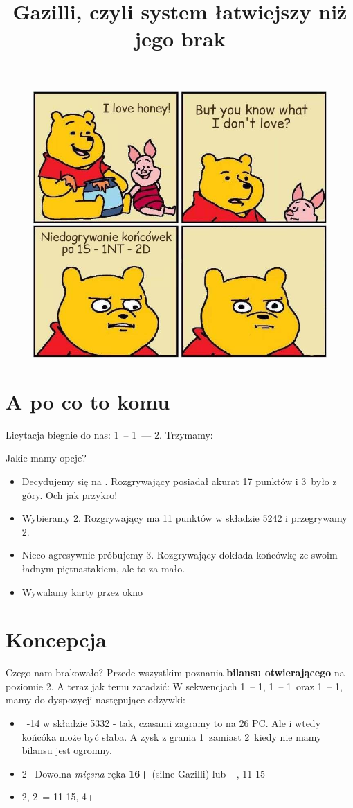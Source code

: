 \documentclass[12pt, a4paper]{article}
\title{Gazilli, czyli system łatwiejszy niż jego brak}
\date{\vspace*{-2cm}}
\begin{document}
\maketitle

\begin{figure}[h!]
    \centering
    \includegraphics[width=0.5\linewidth]{gazilli-1.jpg}
\end{figure}
\section*{A po co to komu}
Licytacja biegnie do nas: 1\spades\ -- 1\nt\ --- 2\diams. Trzymamy:
\begin{center}
\end{center}
Jakie mamy opcje?
\begin{itemize}
    \item Decydujemy się na \pass. Rozgrywający posiadał akurat 17 punktów i 3\nt\ było z góry. Och jak przykro!
    \item Wybieramy 2\hearts. Rozgrywający ma 11 punktów w składzie 5242 i przegrywamy 2\nt.
    \item Nieco agresywnie próbujemy 3\diams. Rozgrywający dokłada końcówkę ze swoim ładnym piętnastakiem,
    ale to za mało.
    \item Wywalamy karty przez okno
\end{itemize}

\pagebreak
\section*{Koncepcja}
Czego nam brakowało? Przede wszystkim poznania \textbf{bilansu otwierającego} na poziomie 2. A teraz jak temu zaradzić:
W sekwencjach 1\hearts\ -- 1\spades, 1\hearts\ -- 1\nt\ oraz 1\spades\ -- 1\nt, mamy do dyspozycji następujące odzywki: 
\begin{itemize}
    \item \pass\ 
    -14 w składzie 5332 - tak, czasami zagramy to na 26 PC. Ale i wtedy końcóka może być słaba.
    A zysk z grania 1\nt\ zamiast 2\nt\ kiedy nie mamy bilansu jest ogromny.

    \item 2\clubs\ \fonce
    \subitem Dowolna \emph{mięsna} ręka \textbf{16+} (silne Gazilli) lub
    \subitem 4+\clubs, 11-15

    \item 2\diams, 2\hearts\ = 11-15, 4+
\end{itemize}
\end{document}
